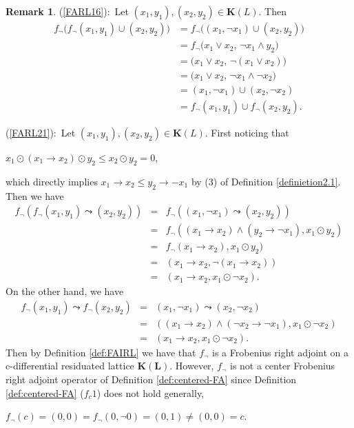 \documentclass[final,12pt,times]{elsarticle}
\theoremstyle{plain}
\theoremstyle{definition}
\newtheorem{remark}[definition]{Remark}
\theoremstyle{break}
\begin{document}
\begin{remark}
(\ref{FARL16}):\ Let $(x_1,y_1),(x_2,y_2)\in \mathbf{K}(L)$. Then
\[
\begin{aligned}
f_{\neg}\bigl(
    f_{\neg}(x_1,y_1)\cup(x_2,y_2)
\bigr)
&=
f_{\neg}\bigl(
    (x_1,\neg x_1)\cup(x_2,y_2)
\bigr)\\
&=
f_{\neg}\bigl(
    x_1\vee x_2,\,
    \neg x_1\wedge y_2
\bigr)\\
&=
\bigl(
    x_1\vee x_2,\,
    \neg(x_1\vee x_2)
\bigr)\\
&=
\bigl(
    x_1\vee x_2,\,
    \neg x_1\wedge\neg x_2
\bigr)\\
&=
(x_1,\neg x_1)\cup(x_2,\neg x_2)\\
&=
f_{\neg}(x_1,y_1)\cup f_{\neg}(x_2,y_2).
\end{aligned}
\]  
             
(\ref{FARL21}):\ Let $(x_1,y_1),(x_2,y_2)\in \mathbf{K}(L)$. First noticing that
 \begin{center} $x_1\odot (x_1\rightarrow x_2)\odot y_2\leq x_2\odot y_2=0$,
  \end{center}
 which directly implies $x_1\rightarrow x_2\leq y_2\rightarrow {-}x_1$ by (3) of Definition \ref{definietion2.1}. Then we have
\begin{eqnarray*}
               f_{\neg}(f_{\neg}(x_1,y_1)\leadsto(x_2,y_2))&=& f_{\neg}((x_1,\neg x_1)\leadsto (x_2,y_2))\\ &=& f_{\neg}((x_1\rightarrow x_2)\wedge(y_2\rightarrow \neg x_1),x_1\odot y_2)\\ &=& f_{\neg}(x_1\rightarrow x_2),x_1\odot y_2)\\ &=& (x_1\rightarrow x_2,\neg (x_1\rightarrow x_2))\\ &=& (x_1\rightarrow x_2,x_1\odot \neg x_2).
               \end{eqnarray*}
On the other hand, we have
\begin{eqnarray*}
               f_{\neg}(x_1,y_1)\leadsto f_{\neg}(x_2,y_2)&=& (x_1,\neg x_1)\leadsto (x_2,\neg x_2)\\ &=& ((x_1\rightarrow x_2)\wedge (\neg x_2\rightarrow \neg x_1), x_1\odot \neg x_2)\\ &=& (x_1\rightarrow x_2,x_1\odot \neg x_2).
               \end{eqnarray*}         
Then by Definition \ref{def:FAIRL} we have that $f_{\neg}$ is a  Frobenius right adjoint  on a c-differential residuated lattice $\mathbf{K(L)}$.
However, $f_{\neg}$ is not a center Frobenius right adjoint operator of Definition \ref{def:centered-FA} since Definition \ref{def:centered-FA} ($f_c1$) does not hold generally,
\begin{center} $f_{\neg}(c)=(0,0)=f_{\neg}(0,\neg 0)=(0,1)\neq (0,0)=c$.
\end{center}
\end{remark}
\end{document}
